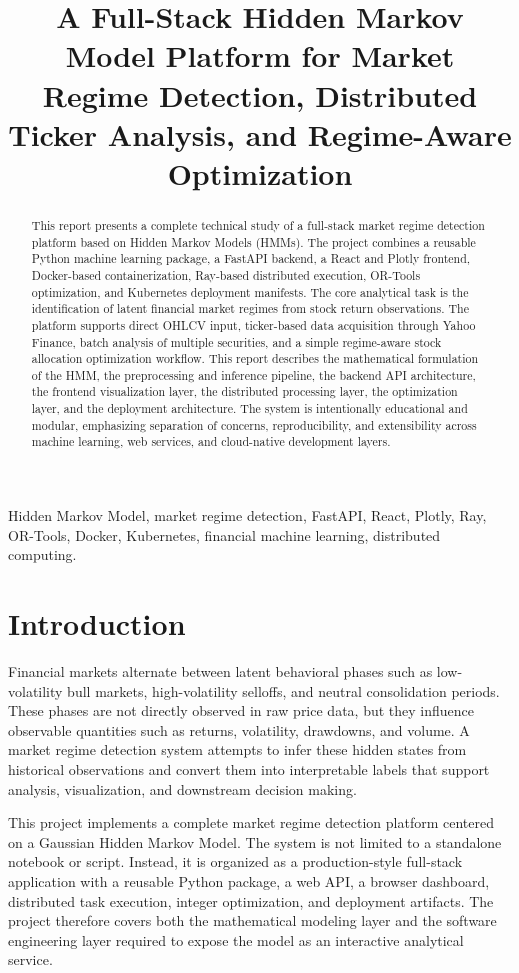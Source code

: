 \documentclass[conference]{IEEEtran}
\title{A Full-Stack Hidden Markov Model Platform for Market Regime Detection, Distributed Ticker Analysis, and Regime-Aware Optimization}
\author{
\IEEEauthorblockN{Aarush Gupta (2024AIB1174) and Arjun Aggarwal (2024AIB1289)}
\IEEEauthorblockA{
HMM Market Regime Detection Platform\\
AI111: Mathematical Foundations of AI and Data Engineering\\
}
}
\begin{document}
\maketitle

\begin{abstract}
This report presents a complete technical study of a full-stack market regime detection platform based on Hidden Markov Models (HMMs). The project combines a reusable Python machine learning package, a FastAPI backend, a React and Plotly frontend, Docker-based containerization, Ray-based distributed execution, OR-Tools optimization, and Kubernetes deployment manifests. The core analytical task is the identification of latent financial market regimes from stock return observations. The platform supports direct OHLCV input, ticker-based data acquisition through Yahoo Finance, batch analysis of multiple securities, and a simple regime-aware stock allocation optimization workflow. This report describes the mathematical formulation of the HMM, the preprocessing and inference pipeline, the backend API architecture, the frontend visualization layer, the distributed processing layer, the optimization layer, and the deployment architecture. The system is intentionally educational and modular, emphasizing separation of concerns, reproducibility, and extensibility across machine learning, web services, and cloud-native development layers.
\end{abstract}

\begin{IEEEkeywords}
Hidden Markov Model, market regime detection, FastAPI, React, Plotly, Ray, OR-Tools, Docker, Kubernetes, financial machine learning, distributed computing.
\end{IEEEkeywords}

\section{Introduction}
Financial markets alternate between latent behavioral phases such as low-volatility bull markets, high-volatility selloffs, and neutral consolidation periods. These phases are not directly observed in raw price data, but they influence observable quantities such as returns, volatility, drawdowns, and volume. A market regime detection system attempts to infer these hidden states from historical observations and convert them into interpretable labels that support analysis, visualization, and downstream decision making.

This project implements a complete market regime detection platform centered on a Gaussian Hidden Markov Model. The system is not limited to a standalone notebook or script. Instead, it is organized as a production-style full-stack application with a reusable Python package, a web API, a browser dashboard, distributed task execution, integer optimization, and deployment artifacts. The project therefore covers both the mathematical modeling layer and the software engineering layer required to expose the model as an interactive analytical service.
\end{document}
